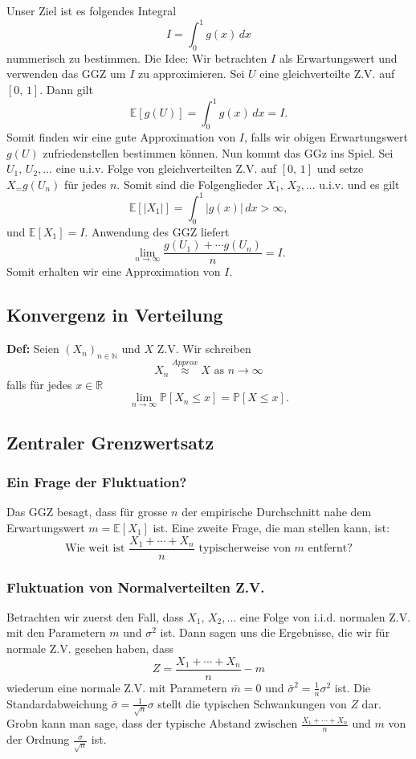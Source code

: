 \documentclass[a4paper]{extarticle}
\begin{document}
Unser Ziel ist es folgendes Integral
\[
    I = \int_0^1 g(x) \, dx
\]
nummerisch zu bestimmen. Die Idee: Wir betrachten $I$ als Erwartungswert und verwenden das GGZ um $I$ zu approximieren. Sei $U$ eine gleichverteilte Z.V. auf $[0, \, 1]$. Dann gilt
\[
    \mathbb{E}[g(U)] = \int_0^1 g(x) \, dx = I.
\]
Somit finden wir eine gute Approximation von $I$, falls wir obigen Erwartungswert $g(U)$ zufriedenstellen bestimmen können. Nun kommt das GGz ins Spiel. Sei $U_1, \, U_2,...$ eine u.i.v. Folge von gleichverteilten Z.V. auf $[0,\, 1]$ und setze $X_ = g(U_n)$ für jedes $n$. Somit sind die Folgenglieder $X_1, \, X_2,...$ u.i.v. und es gilt
\[
    \mathbb{E}[|X_1|] = \int_0^1 |g(x)| \, dx > \infty,
\]
und $\mathbb{E}[X_1] = I$. Anwendung des GGZ liefert
\[
    \lim_{n \to \infty} \frac{g(U_1) + \cdots g(U_n)}{n} = I.
\]
Somit erhalten wir eine Approximation von $I$.

\subsection{Konvergenz in Verteilung}

\textbf{Def:} Seien $(X_n)_{n \in \mathbb{N}}$ und $X$ Z.V. Wir schreiben
\[
    X_n \stackrel{Approx}{\approx} X \text{ as } n \to \infty
\]
falls für jedes $x \in \mathbb{R}$
\[
    \lim_{n \to \infty} \mathbb{P}[X_n \leq x] = \mathbb{P}[X \leq x].
\]

\subsection{Zentraler Grenzwertsatz}

\subsubsection{Ein Frage der Fluktuation?}

Das GGZ besagt, dass für grosse $n$ der empirische Durchschnitt nahe dem Erwartungswert $m = \mathbb{E}[X_1]$ ist. Eine zweite Frage, die man stellen kann, ist:
\[
    \text{Wie weit ist } \frac{X_1 + \cdots + X_n}{n} \text{ typischerweise von } m \text{ entfernt?}
\]

\subsubsection{Fluktuation von Normalverteilten Z.V.}

Betrachten wir zuerst den Fall, dass $X_1, \, X_2,...$ eine Folge von i.i.d. normalen Z.V. mit den Parametern $m$ und $\sigma^2$ ist. Dann sagen uns die Ergebnisse, die wir für normale Z.V. gesehen haben, dass
\[
    Z = \frac{X_1 + \cdots + X_n}{n} - m
\]
wiederum eine normale Z.V. mit Parametern $\bar{m} = 0$ und $\bar{\sigma}^2 = \frac{1}{n}\sigma^2$ ist. Die Standardabweichung $\bar{\sigma} = \frac{1}{\sqrt{n}} \sigma$ stellt die typischen Schwankungen von $Z$ dar. Grobn kann man sage, dass der typische Abstand zwischen $\frac{X_1 + \cdots + X_n}{n}$ und $m$ von der Ordnung $\frac{\sigma}{\sqrt{n}}$ ist.
\end{document}
